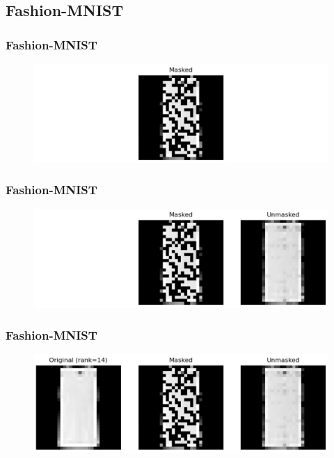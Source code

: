 \documentclass[
	11pt, %
]{beamer}
\begin{document}
\subsection{Fashion-MNIST} 

\begin{frame}
	\frametitle{Fashion-MNIST}
	\begin{figure}
		\centering
		\includegraphics[scale=.3]{assets/mc_ex1_masked.jpeg}
	\end{figure}
\end{frame}

\begin{frame}
	\frametitle{Fashion-MNIST}
	\begin{figure}
		\centering
		\includegraphics[scale=.3]{assets/mc_ex1_unmasked.jpeg}
	\end{figure}
\end{frame}

\begin{frame}
	\frametitle{Fashion-MNIST}
	\begin{figure}
		\centering
		\includegraphics[scale=.3]{assets/mc_ex1_orig.jpg}
	\end{figure}
\end{frame}
\end{document}
